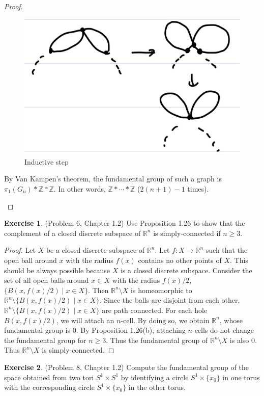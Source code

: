 \documentclass[12pt, psamsfonts]{amsart}
\theoremstyle{definition}
\newtheorem*{exer}{Exercise}
\theoremstyle{remark}
\numberwithin{equation}{section}
\begin{document}
\begin{proof}
\begin{itemize}
\begin{figure}
        \includegraphics[width=.5\linewidth]{induction.jpeg}
          \caption{Inductive step}
        \label{fig:ind}
      \end{figure}
      By Van Kampen's theorem, the fundamental group of such a graph is $\pi_1(G_n) * \mathbb{Z} * \mathbb{Z}$.
      In other words, $\mathbb{Z} * \cdots * \mathbb{Z}$ ($2(n + 1) - 1$ times).
  \end{itemize}
\end{proof}

\begin{exer}{(Problem 6, Chapter 1.2)}
  Use Proposition 1.26 to show that the complement of a closed discrete subspace of $\mathbb{R}^n$ is simply-connected if $n \geq 3$.
\end{exer}

\begin{proof}
  Let $X$ be a closed discrete subspace of $\mathbb{R}^n$.
  Let $f: X \rightarrow \mathbb{R}^n$ such that the open ball around $x$ with the radius $f(x)$ contains no other points of $X$.
  This should be always possible because $X$ is a closed discrete subspace.
  Consider the set of all open balls around $x \in X$ with the radius $f(x) / 2$, $\{ B(x, f(x) / 2) \mid x \in X \}$.
  Then $\mathbb{R}^n \setminus X$ is homeomorphic to $\mathbb{R}^n \setminus \{ B(x, f(x) / 2) \mid x \in X \}$.
  Since the balls are disjoint from each other, $\mathbb{R}^n \setminus \{ B(x, f(x) / 2) \mid x \in X \}$ are path connected.
  For each hole $B(x, f(x) / 2)$, we will attach an $n$-cell.
  By doing so, we obtain $\mathbb{R}^n$, whose fundamental group is 0.
  By Proposition 1.26(b), attaching $n$-cells do not change the fundamental group for $n \geq 3$.
  Thus the fundamental group of $\mathbb{R}^n \setminus X$ is also 0.
  Thus $\mathbb{R}^n \setminus X$ is simply-connected.
\end{proof}

\begin{exer}{(Problem 8, Chapter 1.2)}
  Compute the fundamental group of the space obtained from two tori $S^1 \times S^1$ by identifying a circle $S^1 \times \{ x_0 \}$ in one torus with the corresponding circle $S^1 \times \{ x_0 \}$ in the other torus.
\end{exer}
\end{document}
